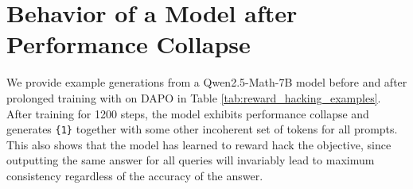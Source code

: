 \newpage

\section{Behavior of a Model after Performance Collapse}\label{app:reward_hacking_examples}

We provide example generations from a Qwen2.5-Math-7B model before and after prolonged training with \algo{} on DAPO in Table \ref{tab:reward_hacking_examples}. After \algo{} training for 1200 steps, the model exhibits performance collapse and generates  \texttt{\string\boxed\{1\}} together with some other incoherent set of tokens for all prompts. This also shows that the model has learned to reward hack the \algo{} objective, since outputting the same answer for all queries will invariably lead to maximum consistency regardless of the accuracy of the answer.

